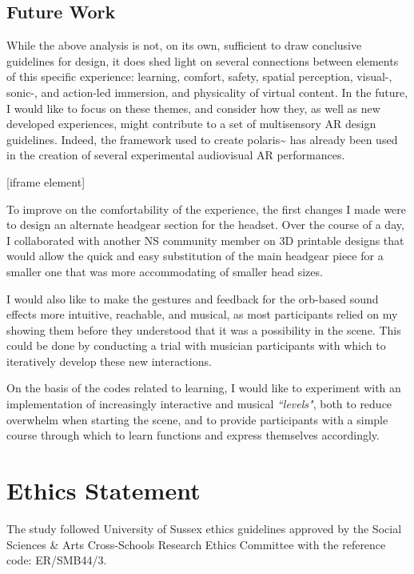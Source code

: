 \subsection{Future Work}\label{sec: polaris-conclusion-future}
While the above analysis is not, on its own, sufficient to draw conclusive guidelines for design, it does shed light on several connections between elements of this specific experience: learning, comfort, safety, spatial perception, visual-, sonic-, and action-led immersion, and physicality of virtual content. In the future, I would like to focus on these themes, and consider how they, as well as new developed experiences, might contribute to a set of multisensory AR design guidelines. Indeed, the framework used to create polaris\textasciitilde{} has already been used in the creation of several experimental audiovisual AR performances.

[iframe element]

To improve on the comfortability of the experience, the first changes I made were to design an alternate headgear section for the headset. Over the course of a day, I collaborated with another NS community member on 3D printable designs that would allow the quick and easy substitution of the main headgear piece for a smaller one that was more accommodating of smaller head sizes.

I would also like to make the gestures and feedback for the orb-based sound effects more intuitive, reachable, and musical, as most participants relied on my showing them before they understood that it was a possibility in the scene. This could be done by conducting a trial with musician participants with which to iteratively develop these new interactions. 

On the basis of the codes related to learning, I would like to experiment with an implementation of increasingly interactive and musical \textit{``levels"}, both to reduce overwhelm when starting the scene, and to provide participants with a simple course through which to learn functions and express themselves accordingly.

\section{Ethics Statement}\label{sec: polaris-ethics}
The study followed University of Sussex ethics guidelines approved by the Social Sciences \& Arts Cross-Schools Research Ethics Committee with the reference code: ER/SMB44/3.

